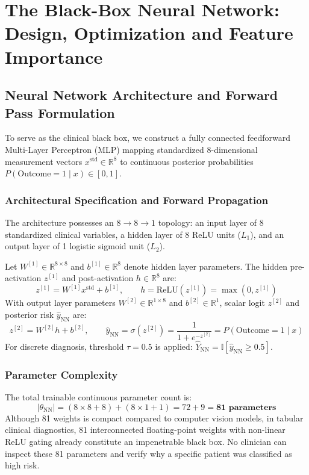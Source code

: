 \documentclass{report}
\begin{document}
\chapter{The Black-Box Neural Network: Design, Optimization and Feature Importance}

\section{Neural Network Architecture and Forward Pass Formulation}

To serve as the clinical black box, we construct a fully connected feedforward Multi-Layer Perceptron (MLP) mapping standardized 8-dimensional measurement vectors $x^{\text{std}} \in \mathbb{R}^8$ to continuous posterior probabilities $P(\text{Outcome} = 1 \mid x) \in [0, 1]$.

\subsection{Architectural Specification and Forward Propagation}
The architecture possesses an $8 \to 8 \to 1$ topology: an input layer of 8 standardized clinical variables, a hidden layer of 8 ReLU units ($L_1$), and an output layer of 1 logistic sigmoid unit ($L_2$).

Let $W^{[1]} \in \mathbb{R}^{8 \times 8}$ and $b^{[1]} \in \mathbb{R}^8$ denote hidden layer parameters. The hidden pre-activation $z^{[1]}$ and post-activation $h \in \mathbb{R}^8$ are:
\begin{equation}
    z^{[1]} = W^{[1]} x^{\text{std}} + b^{[1]}, \qquad h = \text{ReLU}\left(z^{[1]}\right) = \max\left(0, z^{[1]}\right)
\end{equation}
With output layer parameters $W^{[2]} \in \mathbb{R}^{1 \times 8}$ and $b^{[2]} \in \mathbb{R}^1$, scalar logit $z^{[2]}$ and posterior risk $\hat{y}_{\text{NN}}$ are:
\begin{equation}
    z^{[2]} = W^{[2]} h + b^{[2]}, \qquad \hat{y}_{\text{NN}} = \sigma\left(z^{[2]}\right) = \frac{1}{1 + e^{-z^{[2]}}} = P(\text{Outcome} = 1 \mid x)
\end{equation}
For discrete diagnosis, threshold $\tau = 0.5$ is applied: $\hat{Y}_{\text{NN}} = \mathbb{I}[\hat{y}_{\text{NN}} \ge 0.5]$.

\subsection{Parameter Complexity}
The total trainable continuous parameter count is:
\begin{equation}
    |\theta_{\text{NN}}| = (8 \times 8 + 8) + (8 \times 1 + 1) = 72 + 9 = \mathbf{81\text{ parameters}}
\end{equation}
Although 81 weights is compact compared to computer vision models, in tabular clinical diagnostics, 81 interconnected floating-point weights with non-linear ReLU gating already constitute an impenetrable black box. No clinician can inspect these 81 parameters and verify why a specific patient was classified as high risk.
\end{document}
